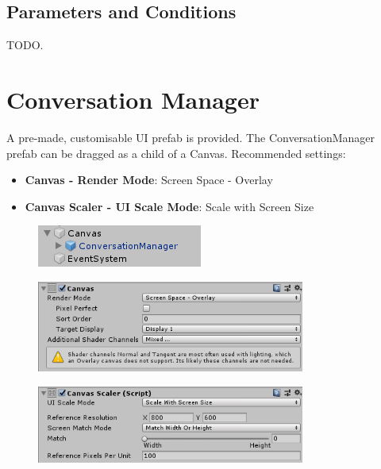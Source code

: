 \documentclass[a4paper,12pt]{article}
\begin{document}
\subsection{Parameters and Conditions}
TODO.

\newpage


\section{Conversation Manager}
\hypertarget{_conversationmanager}{}
A pre-made, customisable UI prefab is provided. The ConversationManager prefab can be dragged as a child of a Canvas. 
\newline
Recommended settings:
\begin{itemize}
\setlength\itemsep{1pt}
	\item \textbf{Canvas - Render Mode}: Screen Space - Overlay
	\item \textbf{Canvas Scaler - UI Scale Mode}: Scale with Screen Size
\end{itemize}

\begin{figure}[h]
\centering
\includegraphics[keepaspectratio]{img/CanvasInHierarchy.png}
\end{figure}

\begin{figure}[h]
\centering
\includegraphics[width=250pt, keepaspectratio]{img/CanvasComponent.png}
\end{figure}


\begin{figure}[h]
\centering
\includegraphics[width=250pt, keepaspectratio]{img/CanvasScalarComponent.png}
\end{figure}
\end{document}
